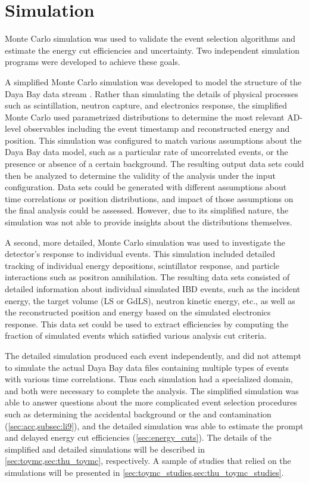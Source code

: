 \chapter{Simulation}

Monte Carlo simulation was used to validate the event selection algorithms
and estimate the energy cut efficiencies and uncertainty.
Two independent simulation programs were developed to achieve these goals.

A simplified Monte Carlo simulation was developed to model the structure
of the Daya Bay data stream \cite{dyb_toymc, dyb_toymc_docdb}.
Rather than simulating the details of physical processes such as scintillation,
neutron capture, and electronics response,
the simplified Monte Carlo used parametrized distributions
to determine the most relevant AD-level observables including the event timestamp
and reconstructed energy and position.
This simulation was configured to match various assumptions
about the Daya Bay data model,
such as a particular rate of uncorrelated events,
or the presence or absence of a certain background.
The resulting output data sets could then be analyzed
to determine the validity of the analysis
under the input configuration.
Data sets could be generated with different assumptions
about time correlations or position distributions,
and impact of those assumptions on the final analysis could be assessed.
However, due to its simplified nature,
the simulation was not able to provide insights about the distributions themselves.

A second, more detailed, Monte Carlo simulation was used
to investigate the detector's response to individual events.
This simulation included detailed tracking of individual energy depositions,
scintillator response, and particle interactions such as positron annihilation.
The resulting data sets consisted of detailed information about individual
simulated IBD events,
such as the incident \nuebar{} energy, the target volume (LS or GdLS),
neutron kinetic energy, etc.,
as well as the reconstructed position and energy
based on the simulated electronics response.
This data set could be used to extract efficiencies
by computing the fraction of simulated events which satisfied
various analysis cut criteria.

The detailed simulation produced each event independently,
and did not attempt to simulate the actual Daya Bay data files
containing multiple types of events with various time correlations.
Thus each simulation had a specialized domain,
and both were necessary to complete the analysis.
The simplified simulation was able to answer questions about the more complicated
event selection procedures such as determining the accidental background
or the \li{} and \he{} contamination (\cref{sec:acc,subsec:li9}),
and the detailed simulation was able to estimate
the prompt and delayed energy cut efficiencies (\cref{sec:energy_cuts}).
The details of the simplified and detailed simulations will be described
in \cref{sec:toymc,sec:thu_toymc}, respectively.
A sample of studies that relied on the simulations will be presented
in \cref{sec:toymc_studies,sec:thu_toymc_studies}.

